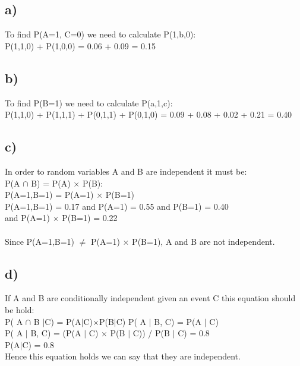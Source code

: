 \documentclass[12pt]{article}
\begin{document}
\subsection*{a)}
To find P(A=1, C=0) we need to calculate P(1,b,0):\\
P(1,1,0) + P(1,0,0) = 0.06 + 0.09 = 0.15
\subsection*{b)}
To find P(B=1) we need to calculate P(a,1,c): \\
P(1,1,0) + P(1,1,1) + P(0,1,1) + P(0,1,0) = 0.09 + 0.08 + 0.02 + 0.21 = 0.40
\subsection*{c)}
In order to random variables A and B are independent it must be:\\ 
P(A $\cap$ B) = P(A) $\times$ P(B):\\
P(A=1,B=1) = P(A=1) $\times$ P(B=1)\\
P(A=1,B=1) = 0.17 and P(A=1) = 0.55 and P(B=1) = 0.40\\ and P(A=1) $\times$ P(B=1) = 0.22\\
\\
Since P(A=1,B=1) $\neq$ P(A=1) $\times$ P(B=1), A and B are not independent.
\subsection*{d)}
If A  and B are conditionally independent given an event C this equation should be hold: \\
P( A $\cap$ B $\mid$C) = P(A$\mid$C)$\times $P(B$\mid$C)
P( A $\mid$ B, C) = P(A $\mid$ C)\\
P( A $\mid$ B, C) = (P(A $\mid$ C) $\times$ P(B $\mid$ C)) / P(B $\mid$ C) = 0.8\\
P(A$\mid$C) = 0.8 \\
Hence this equation holds we can say that they are independent.
\end{document}
